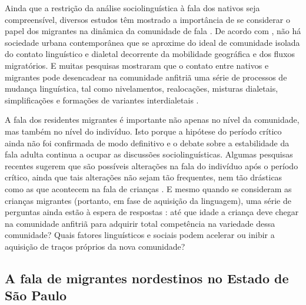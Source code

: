 \documentclass[
	a4paper,	%
	12pt,		%
	]{article}	%
\begin{document}
Ainda que a restrição da análise sociolinguística à fala dos nativos seja
compreensível, diversos estudos têm mostrado a importância de se considerar o
papel dos migrantes na dinâmica da comunidade de fala \citep{Britain2018,
Bortoni-Ricardo2011, Trudgill1986}. De acordo com \citet{Milroy2002}, não há
sociedade urbana contemporânea que se aproxime do ideal de comunidade isolada do
contato linguístico e dialetal decorrente da mobilidade geográfica e dos fluxos
migratórios. E muitas pesquisas mostraram que o contato entre nativos e
migrantes pode desencadear na comunidade anfitriã uma série de processos de
mudança linguística, tal como nivelamentos, realocações, misturas dialetais,
simplificações e formações de variantes interdialetais \citep{Trudgill1986}.

A fala dos residentes migrantes é importante não apenas no nível da
comunidade, mas também no nível do indivíduo. Isto porque a hipótese do
período crítico \citep{Lenneberg1967} ainda não foi confirmada de modo
definitivo e o debate sobre a estabilidade da fala adulta continua a ocupar
as discussões sociolinguísticas. Algumas pesquisas recentes sugerem que são
possíveis alterações na fala do indivíduo após o período crítico, ainda que
tais alterações não sejam tão frequentes, nem tão drásticas como as que
acontecem na fala de crianças \citep{Cukor-Avila.Bailey2013}. E mesmo quando
se consideram as crianças migrantes (portanto, em fase de aquisição da
linguagem), uma série de perguntas ainda estão à espera de respostas
\citep{Oushiro2016, Nycz2015, Chambers1992, Trudgill1986}: até que idade a
criança deve chegar na comunidade anfitriã para adquirir total competência
na variedade dessa comunidade? Quais fatores linguísticos e sociais podem
acelerar ou inibir a aquisição de traços próprios da nova comunidade?

\subsection{A fala de migrantes nordestinos no Estado de São Paulo}
\label{estudos-sp}
\end{document}
